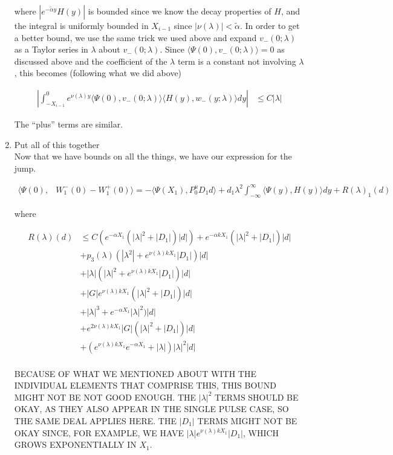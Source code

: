 \documentclass[12pt]{article}
\begin{document}
\begin{enumerate}
where $|e^{-\tilde{\alpha} y} H(y)|$ is bounded since we know the decay properties of $H$, and the integral is uniformly bounded in $X_{i-1}$ since $|\nu(\lambda)| < \tilde{\alpha}$. In order to get a better bound, we use the same trick we used above and expand $v_-(0; \lambda)$ as a Taylor series in $\lambda$ about $v_-(0; \lambda)$. Since $\langle \Psi(0), v_-(0; \lambda) \rangle = 0$ as discussed above and the coefficient of the $\lambda$ term is a constant not involving $\lambda$, this becomes (following what we did above)

\begin{align*}
\left| \int_{-X_{i-1}}^0 e^{\nu(\lambda)y} \langle \Psi(0), v_-(0; \lambda) \rangle
\langle H(y), w_-(y; \lambda) \rangle dy \right| 
&\leq C |\lambda| 
\end{align*}

The ``plus'' terms are similar.

\item Put all of this together\\

Now that we have bounds on all the things, we have our expression for the jump.

\begin{align*}
\langle \Psi(0), &W_1^-(0) - W_1^+(0) \rangle = 
-\langle \Psi(X_1), P^u_0 D_1 d \rangle + d_1 \lambda^2 \int_{-\infty}^\infty \langle \Psi(y), H(y) \rangle dy + R(\lambda)_1(d)
\end{align*}

where

\begin{align*}
R(\lambda)(d) &\leq C( e^{-\alpha X_1}( |\lambda|^2 + |D_1|)|d|) + e^{-\alpha k X_1} ( |\lambda|^2 + |D_1|) |d| \\
&+ p_3(\lambda) (|\lambda^2| + e^{\nu(\lambda)k X_1}|D_1|)|d| \\
&+ |\lambda| (|\lambda|^2 + e^{\nu(\lambda)k X_1} |D_1|)|d| \\
&+ |G| e^{\nu(\lambda)k X_1} ( |\lambda|^2 + |D_1| )|d| \\ 
&+ |\lambda|^3 + e^{-\alpha X_1} |\lambda|^2 )|d| \\
&+ e^{2 \nu(\lambda) k X_1} |G| ( |\lambda|^2 + |D_1| )|d| \\
&+ (e^{\nu(\lambda)k X_1} e^{-\alpha X_1} + |\lambda|)|\lambda|^2|d|\\
\end{align*}

BECAUSE OF WHAT WE MENTIONED ABOUT WITH THE INDIVIDUAL ELEMENTS THAT COMPRISE THIS, THIS BOUND MIGHT NOT BE NOT GOOD ENOUGH. THE $|\lambda|^2$ TERMS SHOULD BE OKAY, AS THEY ALSO APPEAR IN THE SINGLE PULSE CASE, SO THE SAME DEAL APPLIES HERE. THE $|D_1|$ TERMS MIGHT NOT BE OKAY SINCE, FOR EXAMPLE, WE HAVE $|\lambda| e^{\nu(\lambda)k X_1} |D_1|$, WHICH GROWS EXPONENTIALLY IN $X_1$.\\


\end{enumerate}
\end{document}
